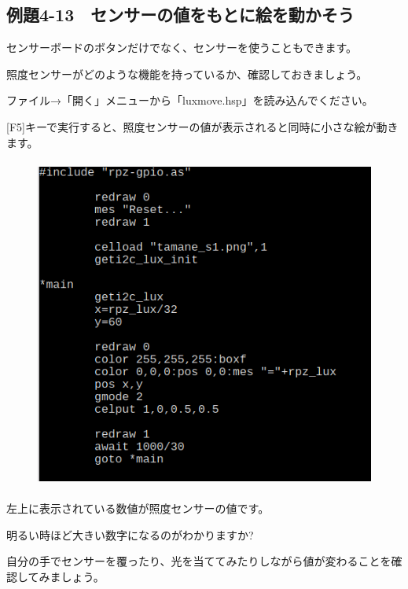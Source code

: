 \newpage
\subsection{例題4-13　センサーの値をもとに絵を動かそう}

\begin{description}
    \item {}
\end{description}

センサーボードのボタンだけでなく、センサーを使うこともできます。

照度センサーがどのような機能を持っているか、確認しておきましょう。


ファイル→「開く」メニューから「luxmove.hsp」を読み込んでください。

[F5]キーで実行すると、照度センサーの値が表示されると同時に小さな絵が動きます。

\begin{figure}[H]
    \begin{center}
      \includegraphics[keepaspectratio,width=11.615cm,height=10.94cm]{text04-img/text04-img040.png}
    \end{center}
    \label{fig:prog_menu}
\end{figure}

左上に表示されている数値が照度センサーの値です。

明るい時ほど大きい数字になるのがわかりますか?

自分の手でセンサーを覆ったり、光を当ててみたりしながら値が変わることを確認してみましょう。

